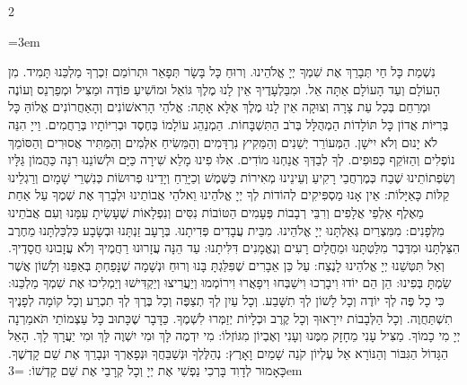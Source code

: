 \documentclass[11pt, openany]{book}
\newenvironment{bilingual}{%
  \par\vspace{4pt}%
  \begin{paracol}{2}%
}{%
  \end{paracol}%
  \par\vspace{2pt}%
}
\newenvironment{hebrewcol}{%
  \switchcolumn[1]%
  \begingroup
  \RTL
  \hebrewfont\large
  \setstretch{1.4}%
  \emergencystretch=3em
  \tolerance=9999
  \parindent=0pt\relax
}{%
  \endRTL
  \endgroup
}
\newenvironment{englishcol}{%
  \switchcolumn[0]%
  \begingroup
  \setstretch{1.4}%
  \emergencystretch=3em
  \tolerance=9999
  \normalsize
  \rightskip=0.12in\relax
}{%
  \endgroup
}
\begin{document}
\begin{bilingual}
\begin{hebrewcol}
נִשְׁמַת כָּל חַי תְּבָרֵךְ אֶת שִׁמְךָ יְיָ אֱלֹהֵינוּ. וְרוּחַ כָּל בָּשָׂר תְּפָאֵר וּתְרוֹמֵם זִכְרְךָ מַלְכֵּנוּ תָּמִיד. מִן הָעוֹלָם וְעַד הָעוֹלָם אַתָּה אֵל. וּמִבַּלְעָדֶיךָ אֵין לָנוּ מֶלֶךְ גּוֹאֵל וּמוֹשִׁיעַ פּוֹדֶה וּמַצִּיל וּמְפַרְנֵס וְעוֹנֶה וּמְרַחֵם בְּכָל עֵת צָרָה וְצוּקָה אֵין לָנוּ מֶלֶךְ אֶלָּא אָתָּה: אֱלֹהֵי הָרִאשׁוֹנִים וְהָאַחֲרוֹנִים אֱלוֹהַּ כָּל בְּרִיּוֹת אֲדוֹן כָּל תּוֹלָדוֹת הַמְהֻלָּל בְּרֹב הַתִּשְׁבָּחוֹת. הַמְנַהֵג עוֹלָמוֹ בְּחֶסֶד וּבְרִיּוֹתָיו בְּרַחֲמִים. וַייָ הִנֵּה לֹא יָנוּם וְלֹא יִישָׁן. הַמְּעוֹרֵר יְשֵׁנִים וְהַמֵּקִיץ נִרְדָּמִים וְהַמֵּשִׂיחַ אִלְּמִים וְהַמַּתִּיר אֲסוּרִים וְהַסּוֹמֵךְ נוֹפְלִים וְהַזּוֹקֵף כְּפוּפִים. לְךָ לְבַדְּךָ אֲנַחְנוּ מוֹדִים. אִלּוּ פִינוּ מָלֵא שִׁירָה כַּיָּם וּלְשׁוֹנֵנוּ רִנָּה כַּהֲמוֹן גַּלָּיו וְשִׂפְתוֹתֵינוּ שֶׁבַח כְּמֶרְחֲבֵי רָקִיעַ וְעֵינֵינוּ מְאִירוֹת כַּשֶּׁמֶשׁ וְכַיָּרֵחַ וְיָדֵינוּ פְרוּשׂוֹת כְּנִשְׁרֵי שָׁמָיִם וְרַגְלֵינוּ קַלּוֹת כָּאַיָּלוֹת: אֵין אָנוּ מַסְפִּיקִים לְהוֹדוֹת לְךָ יְיָ אֱלֹהֵינוּ וֵאלֹהֵי אֲבוֹתֵינוּ וּלְבָרֵךְ אֶת שְׁמֶךָ עַל אַחַת מֵאֶלֶף אַלְפֵי אֲלָפִים וְרִבֵּי רְבָבוֹת פְּעָמִים הַטּוֹבוֹת נִסִּים וְנִפְלָאוֹת שֶׁעָשִׂיתָ עִמָּנוּ וְעִם אֲבֹתֵינוּ מִלְּפָנִים: מִמִּצְרַיִם גְּאַלְתָּנוּ יְיָ אֱלֹהֵינוּ. מִבֵּית עֲבָדִים פְּדִיתָנוּ. בְּרָעָב זַנְתָּנוּ וּבְשָׂבָע כִּלְכַּלְתָּנוּ מֵחֶרֶב הִצַּלְתָּנוּ וּמִדֶּבֶר מִלַּטְתָּנוּ וּמֵחֳלָיִם רָעִים וְנֶאֱמָנִים דִּלִּיתָנוּ: עַד הֵנָּה עֲזָרוּנוּ רַחֲמֶיךָ וְלֹא עֲזָבוּנוּ חֲסָדֶיךָ. וְאַל תִּטְּשֵׁנוּ יְיָ אֱלֹהֵינוּ לָנֶצַח: עַל כֵּן אֵבָרִים שֶׁפִּלַּגְתָּ בָּנוּ וְרוּחַ וּנְשָׁמָה שֶׁנָּפַחְתָּ בְּאַפֵּנוּ וְלָשׁוֹן אֲשֶׁר שַׂמְתָּ בְּפִינוּ: הֵן הֵם יוֹדוּ וִיבָרְכוּ וִישַׁבְּחוּ וִיפָאֲרוּ וִירוֹמְמוּ וְיַעֲרִיצוּ וְיַקְדִּישׁוּ וְיַמְלִיכוּ אֶת שִׁמְךָ מַלְכֵּנוּ: כִּי כָל פֶּה לְךָ יוֹדֶה וְכָל לָשׁוֹן לְךָ תִשָּׁבַע. וְכָל עַיִן לְךָ תְצַפֶּה וְכָל בֶּרֶךְ לְךָ תִכְרַע וְכָל קוֹמָה לְפָנֶיךָ תִשְׁתַּחֲוֶה. וְכָל הַלְּבָבוֹת יִירָאוּךָ וְכָל קֶרֶב וּכְלָיוֹת יְזַמְּרוּ לִשְׁמֶךָ. כַּדָּבָר שֶׁכָּתוּב כָּל עַצְמוֹתַי תֹּאמַרְנָה יְיָ מִי כָמוֹךָ. מַצִּיל עָנִי מֵחָזָק מִמֶּנוּ וְעָנִי וְאֶבְיוֹן מִגּוֹזְלוֹ: מִי יִדְמֶה לָּךְ וּמִי יִשְׁוֶה לָּךְ וּמִי יַעֲרָךְ לָךְ. הָאֵל הַגָּדוֹל הַגִּבּוֹר וְהַנּוֹרָא אֵל עֶלְיוֹן קֹנֵה שָׁמַיִם וָאָרֶץ: נְהַלֶּלְךָ וּנְשַׁבֵּחֲךָ וּנְפָאֶרְךָ וּנְבָרֵךְ אֶת שֵׁם קָדְשֶׁךָ. כָּאָמוּר לְדָוִד בָּרְכִי נַפְשִׁי אֶת יְיָ וְכָל קְרָבַי אֶת שֵׁם קָדְשׁוֹ:
\end{hebrewcol}
\begin{englishcol}

\end{englishcol}
\end{bilingual}
\end{document}
